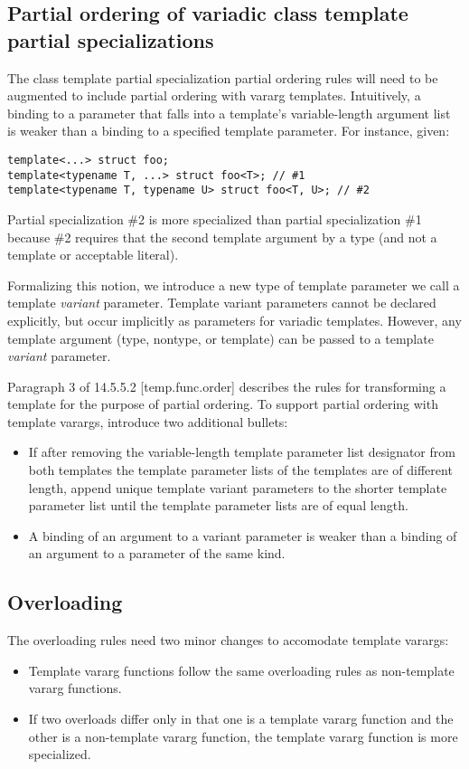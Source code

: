 \documentclass{article}
\begin{document}
\subsection{Partial ordering of variadic class template partial specializations}
The class template partial specialization partial ordering rules will
need to be augmented to include partial ordering with vararg
templates. Intuitively, a binding to a parameter that falls into a
template's variable-length argument list is weaker than a binding to a
specified template parameter. For instance, given:

\begin{verbatim}
template<...> struct foo;
template<typename T, ...> struct foo<T>; // #1
template<typename T, typename U> struct foo<T, U>; // #2
\end{verbatim}

Partial specialization \#2 is more specialized than partial
specialization \#1 because \#2 requires that the second template
argument by a type (and not a template or acceptable
literal). 

Formalizing this notion, we introduce a new type of template
parameter we call a template {\em variant} parameter. Template variant
parameters cannot be declared explicitly, but occur implicitly as
parameters for variadic templates. However, any template argument
(type, nontype, or template) can be passed to a template {\em variant}
parameter. 

Paragraph 3 of 14.5.5.2 [temp.func.order] describes the rules for
transforming a template for the purpose of partial ordering. To
support partial ordering with template varargs, introduce two
additional bullets:
\begin{itemize}
\item If after removing the variable-length template parameter list
  designator from both templates the template parameter lists of the
  templates are of different length, append unique template variant
  parameters to the shorter template parameter list until the template
  parameter lists are of equal length.
\item A binding of an argument to a variant parameter is weaker than a
  binding of an argument to a parameter of the same kind.
\end{itemize}

\subsection{Overloading}
\label{overloading}
The overloading rules need two minor changes to accomodate template
varargs:
\begin{itemize}
\item Template vararg functions follow the same overloading rules as
  non-template vararg functions.
\item If two overloads differ only in that one is a template vararg
  function and the other is a non-template vararg function, the
  template vararg function is more specialized.
\end{itemize}
\end{document}
